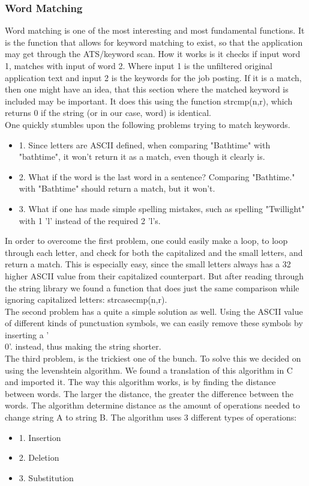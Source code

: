 \subsubsection{Word Matching}
Word matching is one of the most interesting and most fundamental functions. 
It is the function that allows for keyword matching to exist, so that the application
may get through the ATS/keyword scan. How it works is it checks if input word 1, matches with input of word 2.
Where input 1 is the unfiltered original application text and input 2 is the keywords for the job posting.
If it is a match, then one might have an idea, that this section where the matched keyword is included may be important.
It does this using the function strcmp(n,r), which returns 0 if the string (or in our case, word) is identical.
\\
One quickly stumbles upon the following problems trying to match keywords.
\begin{itemize}
  \item 1. Since letters are ASCII defined, when comparing "Bathtime" with "bathtime", it won't return it as a match, even though it clearly is.
  \item 2. What if the word is the last word in a sentence? Comparing "Bathtime." with "Bathtime" should return a match, but it won't.
  \item 3. What if one has made simple spelling mistakes, such as spelling "Twillight" with 1 'l' instead of the required 2 'l's.
\end{itemize}

In order to overcome the first problem, one could easily make a loop, to loop through each letter, and check for both the capitalized and the small letters,
and return a match. This is especially easy, since the small letters always has a 32 higher ASCII value from their capitalized counterpart.
But after reading through the string library we found a function that does just the same comparison while ignoring capitalized letters: strcasecmp(n,r).
\\
The second problem has a quite a simple solution as well. Using the ASCII value of different kinds of punctuation symbols, we can easily remove these symbols by inserting a '\\0'. 
instead, thus making the string shorter.
\\
The third problem, is the trickiest one of the bunch. To solve this we decided on using the levenshtein algorithm. 
We found a translation of this algorithm in C and imported it\cite{levenshtein}.
The way this algorithm works, is by finding the distance between words. The larger the distance, the greater the difference between the words.
The algorithm determine distance as the amount of operations needed to change string A to string B. The algorithm uses 3 different types of operations:
\begin{itemize}
  \item 1. Insertion
  \item 2. Deletion
  \item 3. Substitution
\end{itemize}

